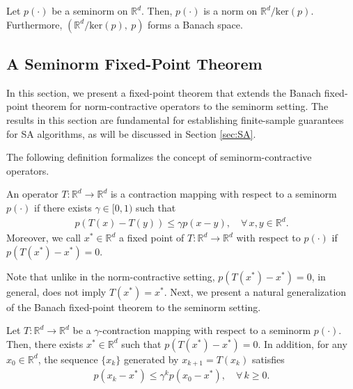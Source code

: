 \documentclass[11 pt]{article}
\begin{document}
	\begin{lemma}
		\label{lemma:p is norm on quotient space}
		Let $p(\cdot)$ be a seminorm on $\mathbb{R}^d$. Then, $p(\cdot)$ is a norm on $\mathbb{R}^d / \text{ker}(p)$. Furthermore, $(\mathbb{R}^d / \text{ker}(p), ~p)$ forms a Banach space.
	\end{lemma}
	
	
	\subsection{A Seminorm Fixed-Point Theorem}
	In this section, we present a fixed-point theorem that extends the Banach fixed-point theorem for norm-contractive operators to the seminorm setting. The results in this section are fundamental for establishing finite-sample guarantees for SA algorithms, as will be discussed in Section \ref{sec:SA}.
	
	The following definition formalizes the concept of seminorm-contractive operators.
	\begin{definition}
		\label{def:seminorm contraction mapping}
		An operator $T: \mathbb{R}^d \to \mathbb{R}^d$ is a contraction mapping with respect to a seminorm $p(\cdot)$ if there exists $\gamma\in [0,1)$ such that 
		\begin{align*}
			p(T(x)-T(y)) \leq \gamma p(x-y),\quad \forall\,x, y \in \mathbb{R}^d.
		\end{align*}
		Moreover, we call $x^* \in \mathbb{R}^d$ a fixed point of $T: \mathbb{R}^d \to \mathbb{R}^d$ with respect to $p(\cdot)$  if $p(T(x^*) - x^*) = 0$.
	\end{definition}
	
	Note that unlike in the norm-contractive setting, $p(T(x^*) - x^*) = 0$, in general, does not imply $T(x^*)=x^*$.
	Next, we present a natural generalization of the Banach fixed-point theorem to the seminorm setting. 
	
	\begin{theorem}
		\label{theorem:Banach fixed-point theorem}
		Let $T: \mathbb{R}^d \to \mathbb{R}^d$ be a $\gamma$-contraction mapping with respect to a seminorm $p(\cdot)$. Then, there exists $x^* \in \mathbb{R}^d$ such that $p(T(x^*)-x^*) = 0$. In addition, for any $x_0 \in \mathbb{R}^d$, the sequence $\{x_k\}$ generated by $x_{k+1} = T(x_k)$ satisfies
		\begin{align*}
			p(x_k - x^*) \leq \gamma^k p(x_0 - x^*), \quad \forall\, k \geq 0.
		\end{align*}
	\end{theorem}
	
\end{document}
